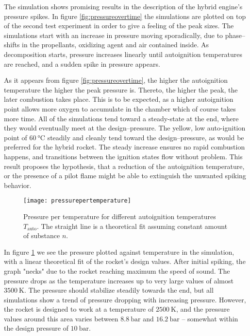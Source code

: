   The simulation shows promising results in the description of the hybrid engine's pressure spikes. In figure \ref{fig:pressureovertime} the simulations are plotted on top of the second test experiment in order to give a feeling of the peak sizes. The simulations start with an increase in pressure moving sporadically, due to phase--shifts in the propellants, oxidizing agent and air contained inside. As decomposition starts, pressure increases linearly until autoignition temperatures are reached, and a sudden spike in pressure appears. 
  
  As it appears from figure \ref{fig:pressureovertime}, the higher the autoignition temperature the higher the peak pressure is. Thereto, the higher the peak, the later combustion takes place. This is to be expected, as a higher autoignition point allows more oxygen to accumulate in the chamber which of course takes more time. All of the simulations tend toward a steady-state at the end, where they would eventually meet at the design--pressure. The yellow, low auto-ignition point of $\SI{60}{\celsius}$ steadily and cleanly tend toward the design--pressure, as would be preferred for the hybrid rocket. The steady increase ensures no rapid combustion happens, and transitions between the ignition states flow without problem. This result proposes the hypothesis, that a reduction of the autoignition temperature, or the presence of a pilot flame might be able to extinguish the unwanted spiking behavior.
  
  

  \begin{figure}
  	\centering
  	\texttt{[image: pressurepertemperature]}
  	\caption{Pressure per temperature for different autoignition temperatures $T_\text{auto}$. The straight line is a theoretical fit assuming constant amount of substance $n$.}
  	\label{fig:pressurepertemperature}
  \end{figure}

  In figure \ref{fig:pressurepertemperature} we see the pressure plotted against temperature in the simulation, with a linear theoretical fit of the rocket's design values. After initial spiking, the graph "necks" due to the rocket reaching maximum the speed of sound. The pressure drops as the temperature increases up to very large values of almost $\SI{3500}{\kelvin}$. The pressure should stabilize steadily towards the end, but all simulations show a trend of pressure dropping with increasing pressure. However, the rocket is designed to work at a temperature of $\SI{2500}{\kelvin}$, and the pressure values around this area varies between $\SI{8.8}{\bar}$ and $\SI{16.2}{\bar}$ -- somewhat within the design pressure of $\SI{10}{\bar}$.

